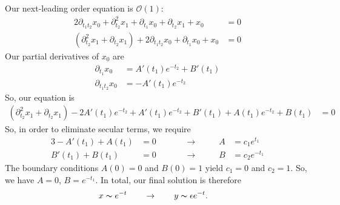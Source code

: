 \documentclass[10pt,letterpaper]{report}
\newcommand{\so}{\qquad \rightarrow \qquad}
\newcommand{\andso}{&\qquad &\rightarrow&\qquad}
\newcommand{\Ord}[1]{\mathcal{O}\left({#1}\right)}
\begin{document}
\begin{enumerate}
\[\]
Our next-leading order equation is $\Ord{1}:$
\begin{align*}
2\partial_{t_1t_2}x_0 + \partial_{t_2}^2x_1 + \partial_{t_1}x_0 + \partial_{t_2}x_1 + x_0 
&= 0
\\
\left(\partial_{t_2}^2x_1 + \partial_{t_2}x_1 \right) + 2\partial_{t_1t_2}x_0 +  \partial_{t_1}x_0 + x_0 &= 0
\end{align*}
Our partial derivatives of $x_0$ are
\begin{align*}
    \partial_{t_1}x_0
    &=
    A'(t_1)e^{-t_2} + B'(t_1)
    \\
    \partial_{t_1t_2}x_0
    &=
    -A'(t_1)e^{-t_2}
\end{align*}
So, our equation is
\begin{align*}
    \left(\partial_{t_2}^2x_1 + \partial_{t_2}x_1 \right)
    -2A'(t_1)e^{-t_2} + A'(t_1)e^{-t_2} + B'(t_1) + A(t_1)e^{-t_2} + B(t_1)
    &=
    0
\end{align*}
So, in order to eliminate secular terms, we require
\begin{alignat*}{3}
    -A'(t_1)+A(t_1) &= 0 
    \andso 
    A &= c_1e^{t_1}
    \\
    B'(t_1) +B(t_1) &= 0
    \andso
    B &= c_2e^{-t_1}
\end{alignat*}
The boundary conditions $A(0) = 0$ and $B(0) = 1$ yield $c_1 = 0$ and $c_2 = 1$. So, we have $A = 0$, $B = e^{-t_1}$. In total, our final solution is therefore
\begin{align*}
    x &\thicksim e^{-t} \so y \thicksim \epsilon e^{-t}.
\end{align*}







\end{enumerate}
\end{document}
